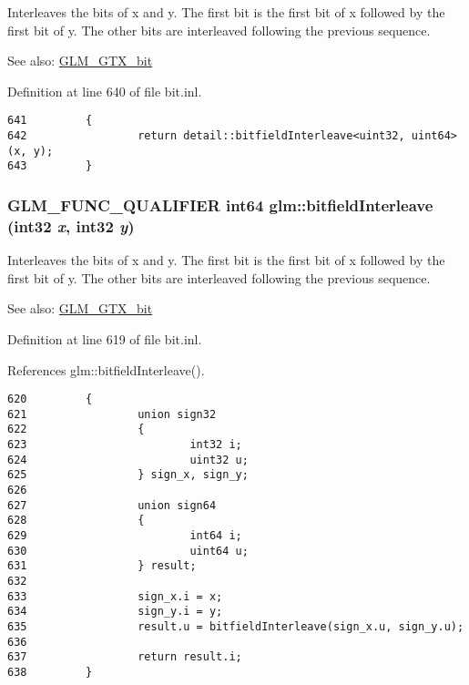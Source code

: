 Interleaves the bits of x and y. The first bit is the first bit of x followed by the first bit of y. The other bits are interleaved following the previous sequence.

\begin{Desc}
\item[See also:]\hyperlink{group__gtx__bit}{GLM\_\-GTX\_\-bit} \end{Desc}


Definition at line 640 of file bit.inl.

\begin{Code}\begin{verbatim}641         {
642                 return detail::bitfieldInterleave<uint32, uint64>(x, y);
643         }
\end{verbatim}
\end{Code}


\hypertarget{group__gtx__bit_g0de51d5985e6a703f305a5a61479babd}{
\subsubsection[bitfieldInterleave]{\setlength{\rightskip}{0pt plus 5cm}GLM\_\-FUNC\_\-QUALIFIER int64 glm::bitfieldInterleave (int32 {\em x}, \/  int32 {\em y})}}
\label{group__gtx__bit_g0de51d5985e6a703f305a5a61479babd}


Interleaves the bits of x and y. The first bit is the first bit of x followed by the first bit of y. The other bits are interleaved following the previous sequence.

\begin{Desc}
\item[See also:]\hyperlink{group__gtx__bit}{GLM\_\-GTX\_\-bit} \end{Desc}


Definition at line 619 of file bit.inl.

References glm::bitfieldInterleave().

\begin{Code}\begin{verbatim}620         {
621                 union sign32
622                 {
623                         int32 i;
624                         uint32 u;
625                 } sign_x, sign_y;
626 
627                 union sign64
628                 {
629                         int64 i;
630                         uint64 u;
631                 } result;
632 
633                 sign_x.i = x;
634                 sign_y.i = y;
635                 result.u = bitfieldInterleave(sign_x.u, sign_y.u);
636 
637                 return result.i;
638         }
\end{verbatim}
\end{Code}




